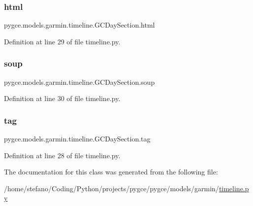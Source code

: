 \subsubsection{\texorpdfstring{html}{html}}
{\footnotesize\ttfamily pygce.\+models.\+garmin.\+timeline.\+G\+C\+Day\+Section.\+html}



Definition at line 29 of file timeline.\+py.

\mbox{\label{classpygce_1_1models_1_1garmin_1_1timeline_1_1_g_c_day_section_ae04dcff466d78ae686dce462057260a9}} 
\subsubsection{\texorpdfstring{soup}{soup}}
{\footnotesize\ttfamily pygce.\+models.\+garmin.\+timeline.\+G\+C\+Day\+Section.\+soup}



Definition at line 30 of file timeline.\+py.

\mbox{\label{classpygce_1_1models_1_1garmin_1_1timeline_1_1_g_c_day_section_a3dacbeacfedec2f69dcbb9fe6870f8a3}} 
\subsubsection{\texorpdfstring{tag}{tag}}
{\footnotesize\ttfamily pygce.\+models.\+garmin.\+timeline.\+G\+C\+Day\+Section.\+tag}



Definition at line 28 of file timeline.\+py.



The documentation for this class was generated from the following file\+:\begin{DoxyCompactItemize}
\item 
/home/stefano/\+Coding/\+Python/projects/pygce/pygce/models/garmin/\hyperlink{timeline_8py}{timeline.\+py}\end{DoxyCompactItemize}
